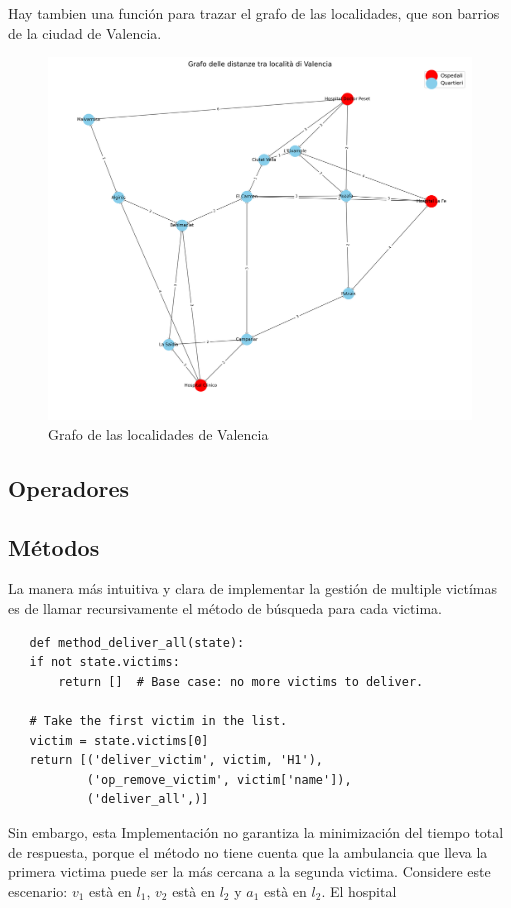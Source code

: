 Hay tambien una función para trazar el grafo de las localidades, que son barrios de la ciudad de Valencia.
\begin{figure}[htbp]
   \centering
   \includegraphics{images/06/valencia_graph.png}
   \caption{Grafo de las localidades de Valencia}
   \label{fig:06/valencia_graph}
\end{figure}

\subsection{Operadores}

\subsection{Métodos}

La manera más intuitiva y clara de implementar la gestión de multiple victímas es de llamar recursivamente el método de búsqueda para cada victima.
\begin{lstlisting}
   def method_deliver_all(state):
   if not state.victims:
       return []  # Base case: no more victims to deliver.
   
   # Take the first victim in the list.
   victim = state.victims[0]
   return [('deliver_victim', victim, 'H1'),
           ('op_remove_victim', victim['name']),
           ('deliver_all',)]

\end{lstlisting}

Sin embargo, esta Implementación no garantiza la minimización del tiempo total de respuesta, porque el método no tiene cuenta que la ambulancia que lleva la primera victima puede ser la más cercana a la segunda victima.
Considere este escenario:
$v_1$ està en $l_1$, $v_2$ està en $l_2$ y $a_1$ està en $l_2$. El hospital 

